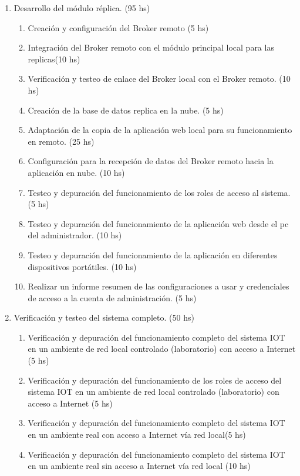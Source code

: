 \documentclass[11pt]{charter}
\begin{document}
\begin{enumerate}
\item Desarrollo del módulo réplica. (95 hs)
	\begin{enumerate}
	\item Creación y configuración del Broker remoto (5 hs)
	\item Integración del Broker remoto con el módulo principal local para las replicas(10 hs)
	\item Verificación y testeo de enlace del Broker local con el Broker remoto. (10 hs)
	\item Creación de la base de datos replica en la nube. (5 hs) 
	\item Adaptación de la copia de la aplicación web local para su funcionamiento en remoto. (25 hs)
	\item Configuración para la recepción de datos del Broker remoto hacia la aplicación en nube.  (10 hs)
	\item Testeo y depuración del funcionamiento de los roles de acceso al sistema. (5 hs) 
	\item Testeo y depuración del funcionamiento de la aplicación web desde el pc del administrador. (10 hs) 
	\item Testeo y depuración del funcionamiento de la aplicación en diferentes dispositivos portátiles. (10 hs)
	\item Realizar un informe resumen de las configuraciones a usar y credenciales de acceso a la cuenta de administración. (5 hs)
	\end{enumerate}	
\item Verificación y testeo del sistema completo. (50 hs)
	\begin{enumerate}
	\item Verificación y depuración del funcionamiento completo del sistema IOT en un ambiente de red local controlado (laboratorio) con acceso a Internet (5 hs)
	\item Verificación y depuración del funcionamiento de los roles de acceso del sistema IOT en un ambiente de red local controlado (laboratorio) con acceso a Internet (5 hs) 
	\item Verificación y depuración del funcionamiento completo del sistema IOT en un ambiente real con acceso a Internet vía red local(5 hs) 
	\item Verificación y depuración del funcionamiento completo del sistema IOT en un ambiente real sin acceso a Internet vía red local (10 hs) 

\end{enumerate}
\end{enumerate}
\end{document}
